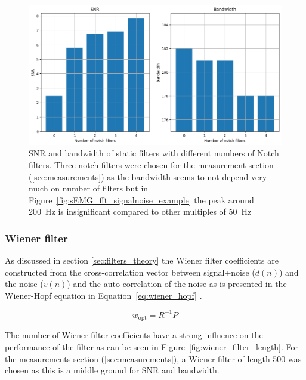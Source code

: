 \begin{figure}[h!t]
	\begin{center}
		\includegraphics[width=1.0\columnwidth]{images/staticfilter_notches_barchart.png}
	\end{center}
	\caption{SNR and bandwidth of static filters with different numbers of Notch filters. Three notch filters were chosen for the measurement section (\ref{sec:measurements}) as the bandwidth seems to not depend very much on number of filters but in Figure~\ref{fig:sEMG_fft_signalnoise_example} the peak around \SI{200}{\hertz} is insignificant compared to other multiples of \SI{50}{\hertz}}
	\label{fig:staticfilter_notches_barchart}
\end{figure}


\subsubsection{Wiener filter}
As discussed in section \ref{sec:filters_theory} the Wiener filter coefficients are constructed from the cross-correlation vector between signal+noise ($d(n)$) and the noise ($v(n)$) and the auto-correlation of the noise as is presented in the Wiener-Hopf equation in Equation~\ref{eq:wiener_hopf} \cite{lecture_adaptive_filters_1}. 

\begin{equation}
    w_\text{opt} = R^{-1}P
    \label{eq:wiener_hopf}
\end{equation}

The number of Wiener filter coefficients have a strong influence on the performance of the filter as can be seen in Figure~\ref{fig:wiener_filter_length}. For the measurements section (\ref{sec:measurements}), a Wiener filter of length 500 was chosen as this is a middle ground for SNR and bandwidth.

